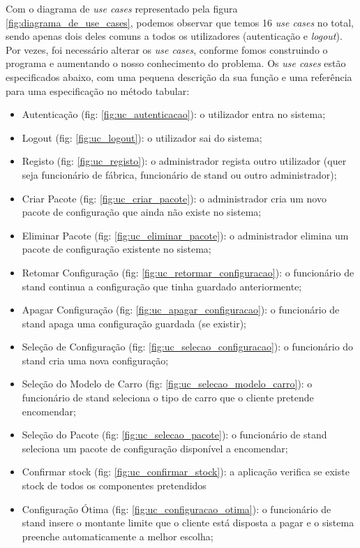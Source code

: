 Com o diagrama de \textit{use cases} representado pela figura \ref{fig:diagrama_de_use_cases}, podemos observar que temos 16 \textit{use cases} no total, sendo apenas dois deles comuns a todos os utilizadores (autenticação e \textit{logout}). Por vezes, foi necessário alterar os \textit{use cases}, conforme fomos construindo o programa e aumentando o nosso conhecimento do problema. Os \textit{use cases} estão especificados abaixo, com uma pequena descrição da sua função e uma referência para uma especificação no método tabular:
\begin{itemize}
    \item Autenticação (fig: \ref{fig:uc_autenticacao}): o utilizador entra no sistema;
    \item Logout (fig: \ref{fig:uc_logout}): o utilizador sai do sistema;
    \item Registo (fig: \ref{fig:uc_registo}): o administrador regista outro utilizador (quer seja funcionário de fábrica, funcionário de stand ou outro administrador);
    \item Criar Pacote (fig: \ref{fig:uc_criar_pacote}): o administrador cria um novo pacote de configuração que ainda não existe no sistema;
    \item Eliminar Pacote (fig: \ref{fig:uc_eliminar_pacote}): o administrador elimina um pacote de configuração existente no sistema;
    \item Retomar Configuração (fig: \ref{fig:uc_retormar_configuracao}): o funcionário de stand continua a configuração que tinha guardado anteriormente;
    \item Apagar Configuração (fig: \ref{fig:uc_apagar_configuracao}): o funcionário de stand apaga uma configuração guardada (se existir);
    \item Seleção de Configuração (fig: \ref{fig:uc_selecao_configuracao}):  o funcionário do stand cria uma nova configuração;
    \item Seleção do Modelo de Carro (fig: \ref{fig:uc_selecao_modelo_carro}): o funcionário de stand seleciona o tipo de carro que o cliente pretende encomendar;
    \item Seleção do Pacote (fig: \ref{fig:uc_selecao_pacote}): o funcionário de stand seleciona um pacote de configuração disponível a encomendar;
    \item Confirmar stock (fig: \ref{fig:uc_confirmar_stock}): a aplicação verifica se existe stock de todos os componentes pretendidos
    \item Configuração Ótima (fig: \ref{fig:uc_configuracao_otima}): o funcionário de stand insere o montante limite que o cliente está disposta a pagar e o sistema preenche automaticamente a melhor escolha;

\end{itemize}
